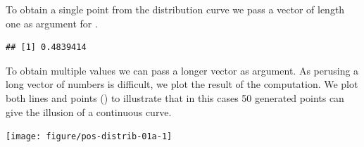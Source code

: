\documentclass[krantz2]{krantz}\usepackage{knitr}%
\begin{document}
To obtain a single point from the distribution curve we pass a vector of length one as argument for .

\begin{knitrout}\footnotesize
{}\color{fgcolor}\begin{kframe}
\begin{alltt}
\hlstd{(} \hlstd{=} \hlstd{,}  \hlstd{=} \hlstd{,}  \hlstd{=} \hlstd{)}
\end{alltt}
\begin{verbatim}
## [1] 0.4839414
\end{verbatim}
\end{kframe}
\end{knitrout}

To obtain multiple values we can pass a longer vector as argument. As perusing a long vector of numbers is difficult, we plot the result of the computation. We plot both lines and points () to illustrate that in this cases 50 generated points can give the illusion of a continuous curve.

\begin{knitrout}\footnotesize
{}\color{fgcolor}\begin{kframe}
\begin{alltt}
 \hlkwb{<-} \hlstd{(} \hlstd{=} \hlopt{-}\hlstd{,}  \hlstd{=} \hlstd{,}  \hlstd{=} \hlstd{)}

 \hlkwb{<-} \hlstd{(} 
                       \hlstd{=} \hlstd{(}   \hlstd{=} \hlstd{,}  \hlstd{=} \hlstd{))}
\hlopt{~}    \hlstd{=} \hlstd{)}
\end{alltt}
\end{kframe}

{\centering \texttt{[image: figure/pos-distrib-01a-1]} 

}



\end{knitrout}
\end{document}
